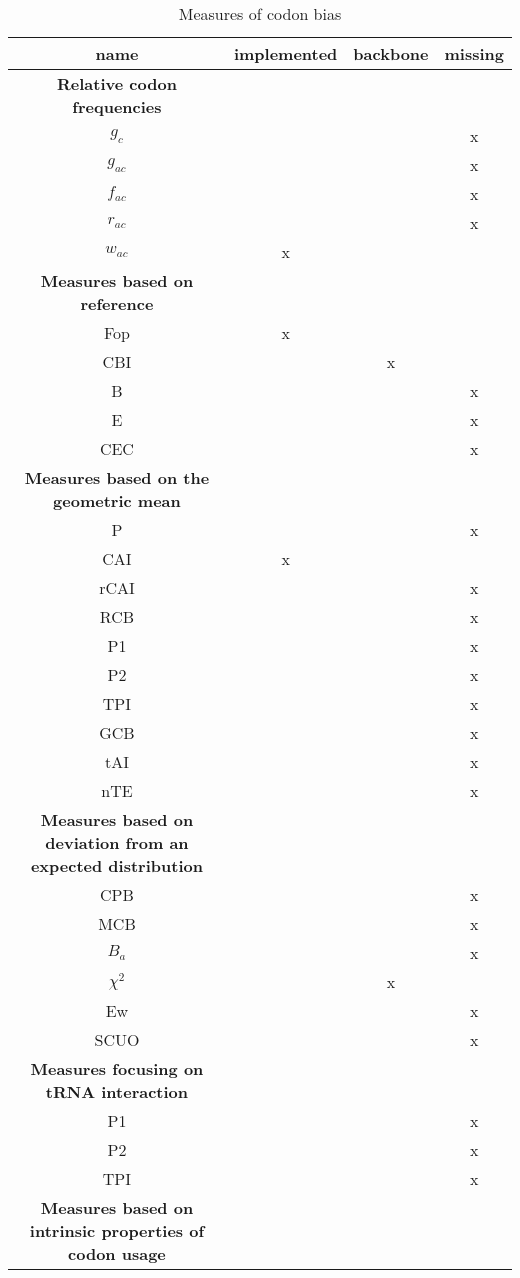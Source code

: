 \begin{table}[tb]
\begin{footnotesize}
\caption[Codon Bias Indices]{Measures of codon bias}
\label{tab:CodonBiasIndices}
\centering
\begin{tabular}{cccc}
\toprule
	name 	& implemented & backbone & missing	  \\ 
\midrule
\textbf{Relative codon frequencies} \\
	$g_c$	& & & x	 \\
	$g_{ac}$	& & & x	 \\
	$f_{ac}$	& & & x	 \\
	$r_{ac}$	& & & x	 \\
	$w_{ac}$	& x & & 	 \\
\midrule
\textbf{Measures based on reference} \\
	Fop	& x	 & & \\
	CBI		& & x &	 \\
	B		& & & x  \\
	E		& & & x	 \\
	CEC		& & & x	 \\
\midrule	
\textbf{Measures based on the geometric mean} \\
	P		& & & x	 \\
	CAI		& x & &	 \\
	rCAI		& & & x	 \\
	RCB		& & & x	 \\
	P1		& & & x	 \\
	P2		& & & x	 \\
	TPI		& & & x	 \\
	GCB		& & & x	 \\
	tAI		& & & x	 \\
	nTE		& & & x	 \\
\midrule	
\textbf{Measures based on deviation from an expected distribution} \\
	CPB		& & & x	 \\
	MCB		& & & x	 \\
	$B_a$	& & & x	 \\
	$\chi^2$ 		& & x &	 \\
	Ew		& & & x	 \\
	SCUO		& & & x	 \\
\midrule	
\textbf{Measures focusing on tRNA interaction} \\
	P1		& & & x	 \\
	P2		& & & x	 \\
	TPI		& & & x	 \\
\midrule	
\textbf{Measures based on intrinsic properties of codon usage} \\

\end{tabular}
\end{footnotesize}
\end{table}
